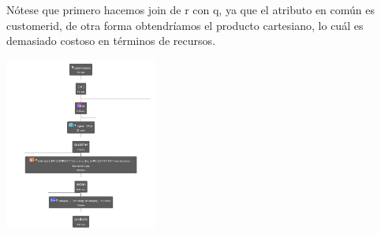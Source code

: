Nótese que primero hacemos join de r con q, ya que el atributo en común es customerid, de otra forma obtendríamos el producto cartesiano, lo cuál es demasiado costoso en términos de recursos. 
\begin{center}
    \includegraphics[width=5cm]{resources/pregunta2/2.3.3}
\end{center}
